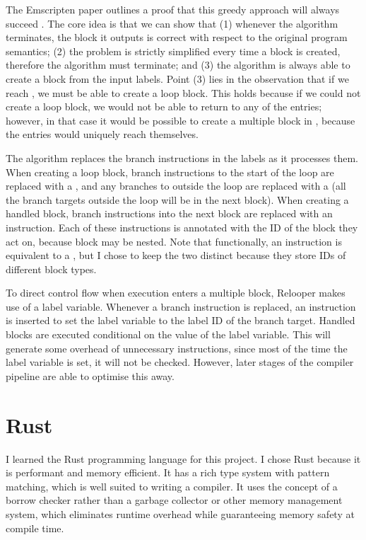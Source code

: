 \documentclass[00-main.tex]{subfiles}
\begin{document}
The Emscripten paper outlines a proof that this greedy approach will always succeed .
The core idea is that we can show that (1) whenever the algorithm terminates, the block it outputs is correct with respect to the original program semantics; (2) the problem is strictly simplified every time a block is created, therefore the algorithm must terminate; and (3) the algorithm is always able to create a block from the input labels.
Point (3) lies in the observation that if we reach , we must be able to create a loop block.
This holds because if we could not create a loop block, we would not be able to return to any of the entries; however, in that case it would be possible to create a multiple block in , because the entries would uniquely reach themselves.

The algorithm replaces the branch instructions in the labels as it processes them.
When creating a loop block, branch instructions to the start of the loop are replaced with a , and any branches to outside the loop are replaced with a  (all the branch targets outside the loop will be in the next block).
When creating a handled block, branch instructions into the next block are replaced with an  instruction.
Each of these instructions is annotated with the ID of the block they act on, because block may be nested.
Note that functionally, an  instruction is equivalent to a , but I chose to keep the two distinct because they store IDs of different block types.

To direct control flow when execution enters a multiple block, Relooper makes use of a label variable.
Whenever a branch instruction is replaced, an instruction is inserted to set the label variable to the label ID of the branch target.
Handled blocks are executed conditional on the value of the label variable.
This will generate some overhead of unnecessary instructions, since most of the time the label variable is set, it will not be checked.
However, later stages of the compiler pipeline are able to optimise this away.


\section{Rust}
\label{sec:prep:rust}

I learned the Rust programming language  for this project.
I chose Rust because it is performant and memory efficient.
It has a rich type system with pattern matching, which is well suited to writing a compiler.
It uses the concept of a borrow checker rather than a garbage collector or other memory management system, which eliminates runtime overhead while guaranteeing memory safety at compile time.
\end{document}
